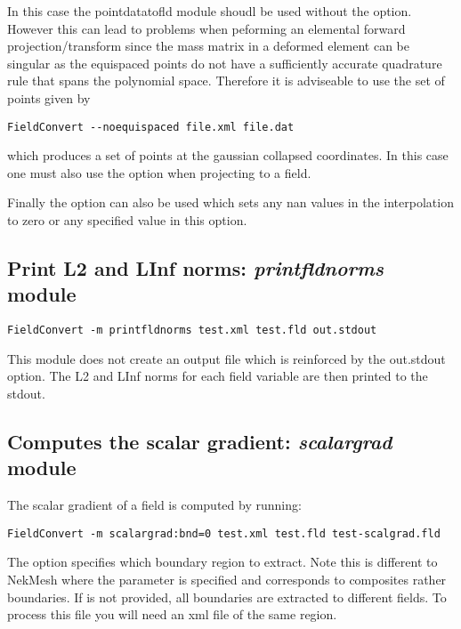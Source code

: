 In this case the pointdatatofld module shoudl be used without the
 option. However this can lead to problems when
peforming an elemental forward projection/transform since the mass
matrix in a deformed element can be singular as the equispaced points
do not have a sufficiently accurate quadrature rule that spans the
polynomial space. Therefore it is adviseable to use the set of points
given by

\begin{lstlisting}[style=BashInputStyle]
FieldConvert --noequispaced file.xml file.dat
\end{lstlisting}

which produces a set of points at the gaussian collapsed
coordinates. In this case one must also use the 
option when projecting to a field.

Finally the option  can also be used which sets
any nan values in the interpolation to zero or any specified value in
this option.

%
%
%

\subsection{Print L2 and LInf norms: \textit{printfldnorms} module}

\begin{lstlisting}[style=BashInputStyle] 
FieldConvert -m printfldnorms test.xml test.fld out.stdout
\end{lstlisting}

This module does not create an output file which is reinforced by the
out.stdout option. The L2 and LInf norms for each field variable are
then printed to the stdout.
%
%
%

\subsection{Computes the scalar gradient: \textit{scalargrad} module}
The scalar gradient of a field is computed by running:
\begin{lstlisting}[style=BashInputStyle]
FieldConvert -m scalargrad:bnd=0 test.xml test.fld test-scalgrad.fld
\end{lstlisting}
The option  specifies which boundary region to extract. Note this is different to NekMesh where the parameter  is specified and corresponds to composites rather boundaries. If  is not provided, all boundaries are extracted to different fields. To process this file you will need an xml file of the same region.

